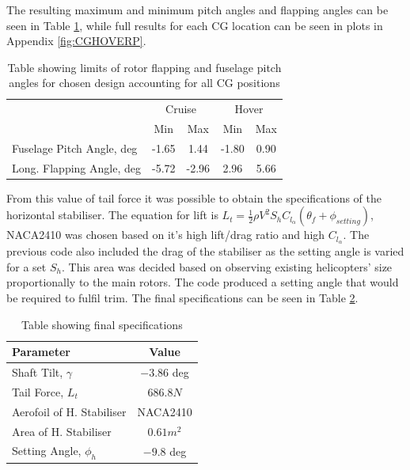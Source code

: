 \documentclass[11pt,a4paper]{article}
\begin{document}
The resulting maximum and minimum pitch angles and flapping angles can be seen in Table \ref{tab:cgres}, while full results for each CG location can be seen in plots in Appendix \ref{fig:CGHOVERP}.
\begin{table}[H]
\centering
\caption{Table showing limits of rotor flapping and fuselage pitch angles for chosen design accounting for all CG positions}
\begin{tabular}{c|c|c|c|c|}
\cline{2-5}
                                                & \multicolumn{2}{c}{\cellcolor[HTML]{DAE8FC}Cruise}                             & \multicolumn{2}{c|}{\cellcolor[HTML]{DAE8FC}Hover}        \\ \cline{2-5} 
                                                & \multicolumn{1}{c|}{\cellcolor[HTML]{DAE8FC}Min} & \cellcolor[HTML]{DAE8FC}Max & \cellcolor[HTML]{DAE8FC}Min & \cellcolor[HTML]{DAE8FC}Max \\ \hline
\multicolumn{1}{|l|}{Fuselage Pitch Angle, deg} & \multicolumn{1}{c|}{-1.65}                       & 1.44                        & -1.80                       & 0.90                        \\ \hline
\multicolumn{1}{|l|}{Long. Flapping Angle, deg} & \multicolumn{1}{c|}{-5.72}                       & -2.96                       & 2.96                        & 5.66                        \\ \hline
\end{tabular}
\label{tab:cgres}
\end{table}
From this value of tail force it was possible to obtain the specifications of the horizontal stabiliser. The equation for lift is $L_t=\frac{1}{2}\rho V^2 S_h C_{l_\alpha}(\theta_f+\phi_{setting})$, NACA2410 was chosen based on it's high lift/drag ratio and high $C_{l_\alpha}$. The previous code also included the drag of the stabiliser as the setting angle is varied for a set $S_h$. This area was decided based on observing existing helicopters' size proportionally to the main rotors. The code produced a setting angle that would be required to fulfil trim. The final specifications can be seen in Table \ref{tab:longfinal}.

\begin{table}[H]
\centering 
    \caption{Table showing final specifications}
\begin{tabular}{lc}
\hline
  \rowcolor[HTML]{DAE8FC} 
  Parameter & Value \\ \hline
   Shaft Tilt, $\gamma$ & $-3.86$ deg\\
   Tail Force, $L_t$ & $686.8N$\\
   Aerofoil of H. Stabiliser & NACA2410\\
   Area of H. Stabiliser & $0.61m^2$\\
   Setting Angle, $\phi_h$ & $-9.8$ deg\\
   \hline
\end{tabular}{}
    \label{tab:longfinal}
\end{table}{}
\end{document}

